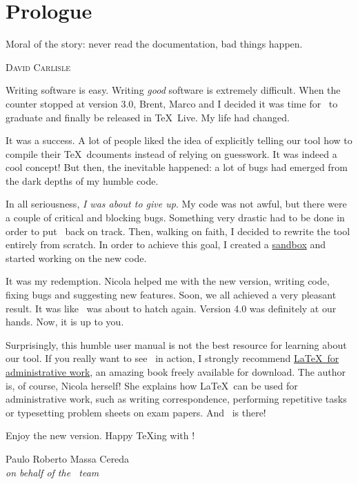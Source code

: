 \chapter*{Prologue}
\label{chap:prologue}

\epigraph{Moral of the story: never read the
documentation, bad things happen.}{\textsc{David Carlisle}}

{\setlength{\parskip}{1em}
Writing software is easy. Writing \emph{good} software is extremely difficult. When the counter stopped at version 3.0, Brent, Marco and I decided it was time for \arara\ to graduate and finally be released in \TeX\ Live. My life had changed.

It was a success. A lot of people liked the idea of explicitly telling our tool how to compile their \TeX\ dcouments instead of relying on guesswork. It was indeed a cool concept! But then, the inevitable happened: a lot of bugs had emerged from the dark depths of my humble code.

In all seriousness, \emph{I was about to give up}. My code was not awful, but there were a couple of critical and blocking bugs. Something very drastic had to be done in order to put \arara\ back on track. Then, walking on faith, I decided to rewrite the tool entirely from scratch. In order to achieve this goal, I created a \href{https://github.com/cereda/nightingale}{sandbox} and started working on the new code.

It was my redemption. Nicola helped me with the new version, writing code, fixing bugs and suggesting new features. Soon, we all achieved a very pleasant result. It was like \arara\ was about to hatch again. Version 4.0 was definitely at our hands. Now, it is up to you.

Surprisingly, this humble user manual is not the best resource for learning about our tool. If you really want to see \arara\ in action, I strongly recommend \href{https://www.dickimaw-books.com/latex/admin}{\LaTeX\ for administrative work}, an amazing book freely available for download. The author is, of course, Nicola herself! She explains how \LaTeX\ can be used for administrative work, such as writing correspondence, performing repetitive tasks or typesetting problem sheets on exam papers. And \arara\ is there!

Enjoy the new version. Happy \TeX ing with \arara!
\par}

\vfill

\begin{flushright}
Paulo Roberto Massa Cereda\\
\emph{on behalf of the \arara\ team}
\end{flushright}
